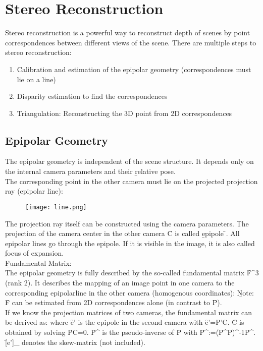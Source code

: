 \section{Stereo Reconstruction}
Stereo reconstruction is a powerful way to reconstruct depth of scenes by point correspondences between different views of the scene. There are multiple steps to stereo reconstruction:
\begin{enumerate}
    \item Calibration and estimation of the epipolar geometry (correspondences must lie on a line)
    \item Disparity estimation to find the correspondences
    \item Triangulation: Reconstructing the 3D point from 2D correspondences
\end{enumerate}

\subsection{Epipolar Geometry}
The epipolar geometry is independent of the scene structure. It depends only on the internal camera parameters and their \b{relative} pose.\\
The corresponding point in the other camera must lie on the projected projection ray (epipolar line):

\begin{figure}[h!]
    \centering
    \texttt{[image: line.png]}
\end{figure}

The projection ray itself can be constructed using the camera parameters. The projection of the camera center in the other camera \f{C} is called \b{epipole} \f{}. All epipolar lines go through the epipole. If it is visible in the image, it is also called \b{focus of expansion}.\\

\b{Fundamental Matrix:\\[0.5em]}
The epipolar geometry is fully described by the so-called fundamental matrix \f{F^{3}} (rank 2). It describes the mapping of an image point in one camera to the corresponding epipolarline in the other camera (homogenous coordinates):
\b{Note:} \f{F} can be estimated from 2D correspondences alone (in contrast to \f{P}).\\

If we know the projection matrices of two cameras, the fundamental matrix can be derived as:
where \f{e'} is the epipole in the second camera with \f{e'=P'C}. \f{C} is obtained by solving \f{PC=0}. \f{P^\dagger} is the pseudo-inverse of \f{P} with \f{P^\dagger :=(P^\top P)^{-1}P^\top}. \f{[e']_\times} denotes the skew-matrix (not included).\\

